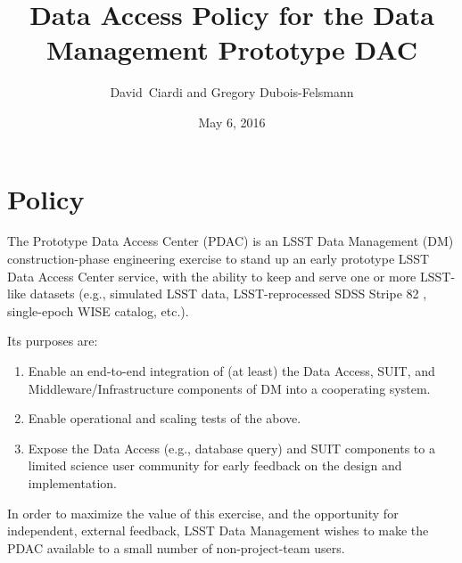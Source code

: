 \documentclass[DM,lsstdraft,toc]{lsstdoc}
\title[Data Access Policy for PDAC]{Data Access Policy for the Data Management Prototype DAC}
\author{David~Ciardi and Gregory Dubois-Felsmann}
\date{May 6, 2016}
\begin{document}
\maketitle

\section{Policy}

The Prototype Data Access Center (PDAC) is an LSST Data Management (DM) construction-phase engineering exercise to stand up an early prototype LSST Data Access Center service, with the ability to keep and serve one or more LSST-like datasets (e.g., simulated LSST data, LSST-reprocessed SDSS Stripe 82 \citep{Document-15097}, single-epoch WISE catalog, etc.).

Its purposes are:

\begin{enumerate}
\item Enable an end-to-end integration of (at least) the Data Access, SUIT, and Middleware/Infrastructure components of DM into a cooperating system.

\item Enable operational and scaling tests of the above.

\item Expose the Data Access (e.g., database query) and SUIT components to a limited science user community for early feedback on the
design and implementation.
\end{enumerate}

In order to maximize the value of this exercise, and the opportunity for independent, external feedback, LSST Data Management wishes to make the PDAC available to a small number of non-project-team users.
\end{document}
